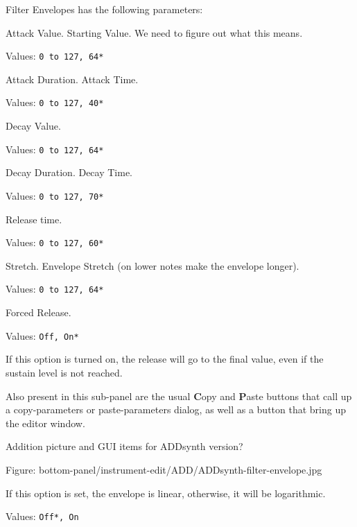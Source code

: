    Filter Envelopes has the following parameters:

   \setcounter{ItemCounter}{0}      %

   Attack Value.  Starting Value.
   We need to figure out what this means.

   Values: \texttt{0 to 127, 64*}

   Attack Duration.  Attack Time.

   Values: \texttt{0 to 127, 40*}

   Decay Value.

   Values: \texttt{0 to 127, 64*}

   Decay Duration.  Decay Time.

   Values: \texttt{0 to 127, 70*}

   Release time.

   Values: \texttt{0 to 127, 60*}

   Stretch.
   Envelope Stretch (on lower notes make the envelope longer).

   Values: \texttt{0 to 127, 64*}

   Forced Release.

   Values: \texttt{Off, On*}

   If this option is turned on, the release will go to the
   final value, even if the sustain level is not reached.

   Also present in this sub-panel are the usual \textbf{C}opy
   and \textbf{P}aste buttons that call up a copy-parameters or
   paste-parameters dialog, as well as a button that bring up the editor
   window.

   Addition picture and GUI items for ADDsynth version?

   Figure: bottom-panel/instrument-edit/ADD/ADDsynth-filter-envelope.jpg

   If this option is set, the envelope is linear, otherwise, it will be
   logarithmic.

   Values: \texttt{Off*, On}


